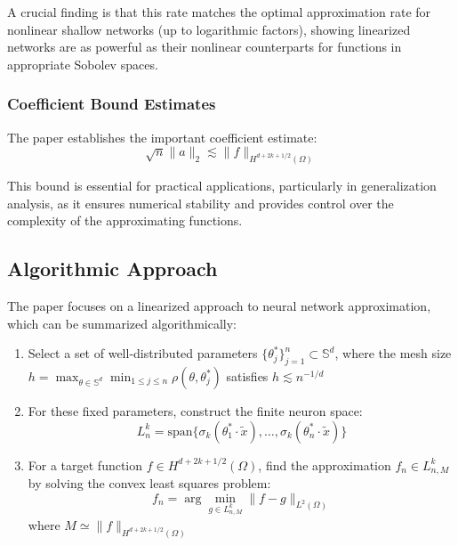 \documentclass[11pt]{article}
\begin{document}
A crucial finding is that this rate matches the optimal approximation rate for nonlinear shallow networks (up to logarithmic factors), showing linearized networks are as powerful as their nonlinear counterparts for functions in appropriate Sobolev spaces.

\subsubsection{Coefficient Bound Estimates}

The paper establishes the important coefficient estimate:
\begin{equation}
\sqrt{n}\|a\|_2 \lesssim \|f\|_{H^{d+2k+1/2}(\Omega)}
\end{equation}

This bound is essential for practical applications, particularly in generalization analysis, as it ensures numerical stability and provides control over the complexity of the approximating functions.

\subsection{Algorithmic Approach}

The paper focuses on a linearized approach to neural network approximation, which can be summarized algorithmically:

\begin{enumerate}
    \item Select a set of well-distributed parameters $\{\theta_j^*\}_{j=1}^n \subset \mathbb{S}^d$, where the mesh size $h = \max_{\theta \in \mathbb{S}^d} \min_{1 \leq j \leq n} \rho(\theta, \theta_j^*)$ satisfies $h \lesssim n^{-1/d}$
    
    \item For these fixed parameters, construct the finite neuron space:
    \begin{equation}
    L_n^k = \text{span}\{\sigma_k(\theta_1^* \cdot \tilde{x}), \ldots, \sigma_k(\theta_n^* \cdot \tilde{x})\}
    \end{equation}
    
    \item For a target function $f \in H^{d+2k+1/2}(\Omega)$, find the approximation $f_n \in L_{n,M}^k$ by solving the convex least squares problem:
    \begin{equation}
    f_n = \arg\min_{g \in L_{n,M}^k} \|f - g\|_{L^2(\Omega)}
    \end{equation}
    where $M \simeq \|f\|_{H^{d+2k+1/2}(\Omega)}$
\end{enumerate}
\end{document}

